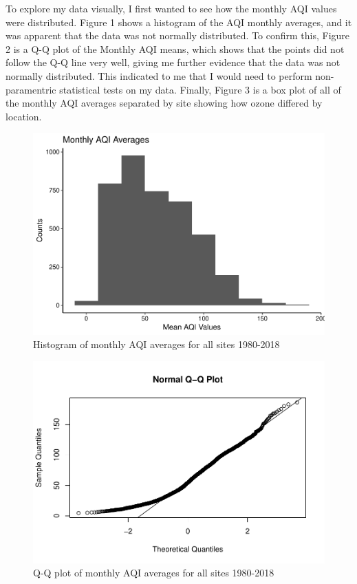 \documentclass[12pt,]{article}
\begin{document}
To explore my data visually, I first wanted to see how the monthly AQI
values were distributed. Figure 1 shows a histogram of the AQI monthly
averages, and it was apparent that the data was not normally
distributed. To confirm this, Figure 2 is a Q-Q plot of the Monthly AQI
means, which shows that the points did not follow the Q-Q line very
well, giving me further evidence that the data was not normally
distributed. This indicated to me that I would need to perform
non-paramentric statistical tests on my data. Finally, Figure 3 is a box
plot of all of the monthly AQI averages separated by site showing how
ozone differed by location.

\begin{figure}
\centering
\includegraphics{Roth_ENV872_Project_files/figure-latex/exploratory graph1-1.pdf}
\caption{Histogram of monthly AQI averages for all sites 1980-2018}
\end{figure}

\begin{figure}
\centering
\includegraphics{Roth_ENV872_Project_files/figure-latex/exploratory graph2-1.pdf}
\caption{Q-Q plot of monthly AQI averages for all sites 1980-2018}
\end{figure}
\end{document}
